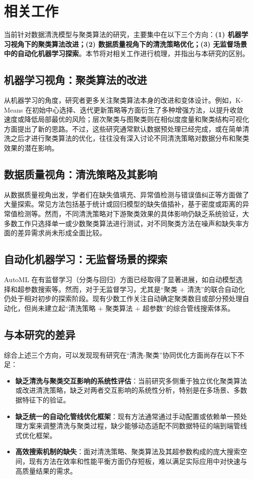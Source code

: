 \documentclass[10pt]{article} %
\numberwithin{equation}{section}
\begin{document}

\section{相关工作}\label{sec:related_work}

当前针对数据清洗模型与聚类算法的研究，主要集中在以下三个方向：\textbf{(1) 机器学习视角下的聚类算法改进；(2) 数据质量视角下的清洗策略优化；(3) 无监督场景中的自动化机器学习探索}。本节将对相关工作进行梳理，并指出与本研究的区别。

\subsection{机器学习视角：聚类算法的改进}
从机器学习的角度，研究者更多关注聚类算法本身的改进和变体设计。例如，K-Means 在初始中心选择、迭代更新策略等方面衍生了多种增强方法，以提升收敛速度或降低局部最优的风险；层次聚类与图聚类则在相似度度量和聚类结构可视化方面提出了新的思路。不过，这些研究通常默认数据预处理已经完成，或在简单清洗之后才进行聚类算法的优化，往往没有深入讨论不同清洗策略对数据分布和聚类效果的潜在影响。

\subsection{数据质量视角：清洗策略及其影响}
从数据质量视角出发，学者们在缺失值填充、异常值检测与错误值纠正等方面做了大量探索。常见方法包括基于统计或回归模型的缺失值插补，基于密度或距离的异常值检测等。然而，不同清洗策略对下游聚类效果的具体影响仍缺乏系统验证，大多数工作只选择单一或少数聚类算法进行测试，对不同聚类方法在噪声和缺失率方面的差异需求尚未形成全面比较。

\subsection{自动化机器学习：无监督场景的探索}
AutoML 在有监督学习（分类与回归）方面已经取得了显著进展，如自动模型选择和超参数搜索等。然而，对于无监督学习，尤其是“聚类 + 清洗”的联合自动化仍处于相对初步的探索阶段。现有少数工作关注自动确定聚类数目或部分预处理自动化，但尚未建立起“清洗策略 + 聚类算法 + 超参数”的综合管线搜索体系。

\subsection{与本研究的差异}
综合上述三个方向，可以发现现有研究在“清洗-聚类”协同优化方面尚存在以下不足：
\begin{itemize}
    \item \textbf{缺乏清洗与聚类交互影响的系统性评估}：当前研究多侧重于独立优化聚类算法或改进清洗策略，缺乏对两者交互影响的系统性分析，特别是在多场景、多数据特征下的验证。
    \item \textbf{缺乏统一的自动化管线优化框架}：现有方法通常通过手动配置或依赖单一预处理方案来调整清洗与聚类过程，缺少能够动态适配不同数据特征的端到端管线式优化框架。
    \item \textbf{高效搜索机制的缺失}：面对清洗策略、聚类算法及其超参数构成的庞大搜索空间，现有方法在效率和性能平衡方面仍存短板，难以满足实际应用中对快速与高质量结果的需求。
\end{itemize}
\end{document}

